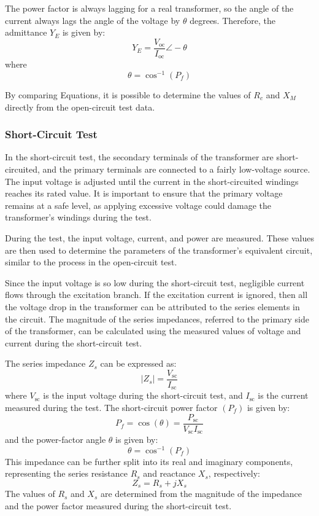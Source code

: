 \documentclass[a4paper,12pt]{article}
\begin{document}
	The power factor is always lagging for a real transformer, so the angle of the current always lags the angle of the voltage by $\theta$ degrees. Therefore, the admittance $Y_E$ is given by:
	\[
	Y_E = \frac{V_{\text{oc}}}{I_{\text{oc}}} \angle -\theta
	\]
	where \[
	\theta = \cos^{-1}(P_f)
	\]
	
	By comparing Equations, it is possible to determine the values of $R_c$ and $X_M$ directly from the open-circuit test data.
	
	\newpage
	\subsubsection{Short-Circuit Test}
	
	In the short-circuit test, the secondary terminals of the transformer are short-circuited, and the primary terminals are connected to a fairly low-voltage source. The input voltage is adjusted until the current in the short-circuited windings reaches its rated value. It is important to ensure that the primary voltage remains at a safe level, as applying excessive voltage could damage the transformer's windings during the test.
	
	During the test, the input voltage, current, and power are measured. These values are then used to determine the parameters of the transformer's equivalent circuit, similar to the process in the open-circuit test.
	
	Since the input voltage is so low during the short-circuit test, negligible current flows through the excitation branch. If the excitation current is ignored, then all the voltage drop in the transformer can be attributed to the series elements in the circuit. The magnitude of the series impedances, referred to the primary side of the transformer, can be calculated using the measured values of voltage and current during the short-circuit test.
	
	The series impedance $Z_s$ can be expressed as:
	\[
	|Z_s| = \frac{V_{\text{sc}}}{I_{\text{sc}}}
	\]
	where \( V_{\text{sc}} \) is the input voltage during the short-circuit test, and \( I_{\text{sc}} \) is the current measured during the test.
	The short-circuit power factor $(P_f)$ is given by:
	\[
	P_f = \cos(\theta) = \frac{P_{\text{sc}}}{V_{\text{sc}}I_{\text{sc}}}
	\]
	and the power-factor angle $\theta$ is given by:
	\[
	\theta = \cos^{-1}(P_f)
	\]
	This impedance can be further split into its real and imaginary components, representing the series resistance $R_s$ and reactance $X_s$, respectively:
	\[
	Z_s = R_s + j X_s
	\]
	The values of $R_s$ and $X_s$ are determined from the magnitude of the impedance and the power factor measured during the short-circuit test.
	\newpage
\end{document}
